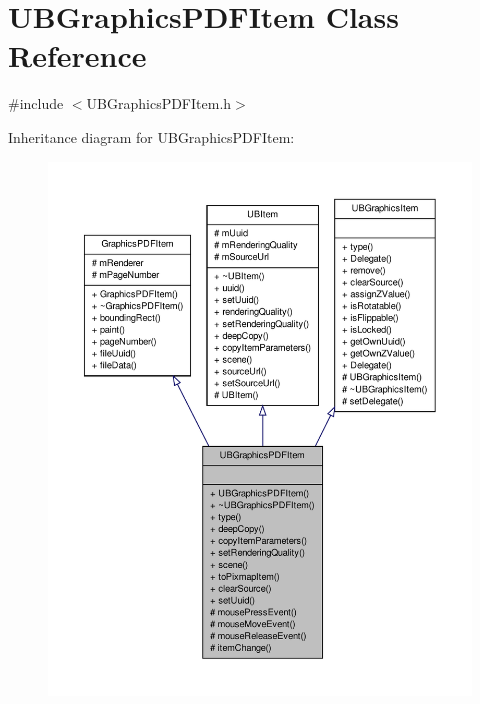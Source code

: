 \hypertarget{class_u_b_graphics_p_d_f_item}{\section{U\-B\-Graphics\-P\-D\-F\-Item Class Reference}
\label{d9/d0d/class_u_b_graphics_p_d_f_item}
}


{\ttfamily \#include $<$U\-B\-Graphics\-P\-D\-F\-Item.\-h$>$}



Inheritance diagram for U\-B\-Graphics\-P\-D\-F\-Item\-:
\nopagebreak
\begin{figure}[H]
\begin{center}
\leavevmode
\includegraphics[width=350pt]{d2/d0d/class_u_b_graphics_p_d_f_item__inherit__graph}
\end{center}
\end{figure}


